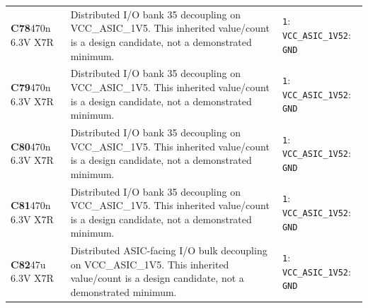 \documentclass[11pt,a4paper]{article}
\begin{document}
\begin{longtable}{@{}P{27mm}P{84mm}P{57mm}@{}}
\textbf{C78}\newline 470n 6.3V X7R & Distributed I/O bank 35 decoupling on VCC\_ASIC\_1V5. This inherited value/count is a design candidate, not a demonstrated minimum. & \nolinkurl{1}: \nolinkurl{VCC_ASIC_1V5}\newline \nolinkurl{2}: \nolinkurl{GND} \\
\textbf{C79}\newline 470n 6.3V X7R & Distributed I/O bank 35 decoupling on VCC\_ASIC\_1V5. This inherited value/count is a design candidate, not a demonstrated minimum. & \nolinkurl{1}: \nolinkurl{VCC_ASIC_1V5}\newline \nolinkurl{2}: \nolinkurl{GND} \\
\textbf{C80}\newline 470n 6.3V X7R & Distributed I/O bank 35 decoupling on VCC\_ASIC\_1V5. This inherited value/count is a design candidate, not a demonstrated minimum. & \nolinkurl{1}: \nolinkurl{VCC_ASIC_1V5}\newline \nolinkurl{2}: \nolinkurl{GND} \\
\textbf{C81}\newline 470n 6.3V X7R & Distributed I/O bank 35 decoupling on VCC\_ASIC\_1V5. This inherited value/count is a design candidate, not a demonstrated minimum. & \nolinkurl{1}: \nolinkurl{VCC_ASIC_1V5}\newline \nolinkurl{2}: \nolinkurl{GND} \\
\textbf{C82}\newline 47u 6.3V X7R & Distributed ASIC-facing I/O bulk decoupling on VCC\_ASIC\_1V5. This inherited value/count is a design candidate, not a demonstrated minimum. & \nolinkurl{1}: \nolinkurl{VCC_ASIC_1V5}\newline \nolinkurl{2}: \nolinkurl{GND} \\

\end{longtable}
\end{document}
